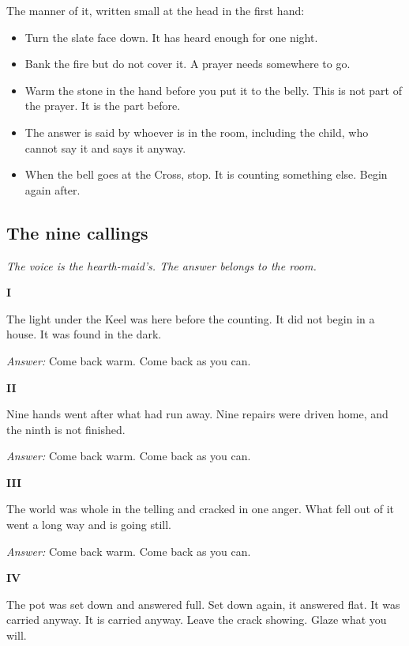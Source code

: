 \documentclass{design/chronicle}
\begin{document}
The manner of it, written small at the head in the first hand:

\begin{itemize}[leftmargin=1.4em,itemsep=1pt,topsep=3pt,parsep=0pt]

\item Turn the slate face down. It has heard enough for one night.

\item Bank the fire but do not cover it. A prayer needs somewhere to go.

\item Warm the stone in the hand before you put it to the belly. This is not part of the prayer. It is the part before.

\item The answer is said by whoever is in the room, including the child, who cannot say it and says it anyway.

\item When the bell goes at the Cross, stop. It is counting something else. Begin again after.

\end{itemize}

\subsection*{The nine callings}

\emph{The voice is the hearth-maid’s. The answer belongs to the room.}

\textbf{I}

The light under the Keel was here before the counting. It did not begin in a house. It was found in the dark.

\emph{Answer:} Come back warm. Come back as you can.

\textbf{II}

Nine hands went after what had run away. Nine repairs were driven home, and the ninth is not finished.

\emph{Answer:} Come back warm. Come back as you can.

\textbf{III}

The world was whole in the telling and cracked in one anger. What fell out of it went a long way and is going still.

\emph{Answer:} Come back warm. Come back as you can.

\textbf{IV}

The pot was set down and answered full. Set down again, it answered flat. It was carried anyway. It is carried anyway. Leave the crack showing. Glaze what you will.
\end{document}
